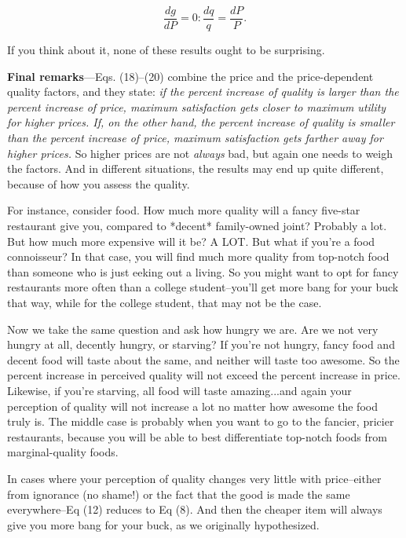 \documentclass[11pt]{article}
\begin{document}
\begin{equation}
	\frac{dg}{dP} = 0: \frac{dq}{q} = \frac{dP}{P}.
\end{equation}

If you think about it, none of these results ought to be surprising.

\vspace{16pt}
\textbf{Final remarks}---Eqs. (18)--(20) combine the price and the price-dependent quality factors, and they state: \textit{if the percent increase of quality is larger than the percent increase of price, maximum satisfaction gets closer to maximum utility for higher prices. If, on the other hand, the percent increase of quality is smaller than the percent increase of price, maximum satisfaction gets farther away for higher prices.} So higher prices are not \textit{always} bad, but again one needs to weigh the factors. And in different situations, the results may end up quite different, because of how you assess the quality.

For instance, consider food. How much more quality will a fancy five-star restaurant give you, compared to *decent* family-owned joint? Probably a lot. But how much more expensive will it be? A LOT. But what if you're a food connoisseur? In that case, you will find much more quality from top-notch food than someone who is just eeking out a living. So you might want to opt for fancy restaurants more often than a college student--you'll get more bang for your buck that way, while for the college student, that may not be the case. 

Now we take the same question and ask how hungry we are. Are we not very hungry at all, decently hungry, or starving? If you're not hungry, fancy food and decent food will taste about the same, and neither will taste too awesome. So the percent increase in perceived quality will not exceed the percent increase in price. Likewise, if you're starving, all food will taste amazing...and again your perception of quality will not increase a lot no matter how awesome the food truly is. The middle case is probably when you want to go to the fancier, pricier restaurants, because you will be able to best differentiate top-notch foods from marginal-quality foods. 

In cases where your perception of quality changes very little with price--either from ignorance (no shame!) or the fact that the good is made the same everywhere--Eq (12) reduces to Eq (8). And then the cheaper item will always give you more bang for your buck, as we originally hypothesized.
\end{document}
